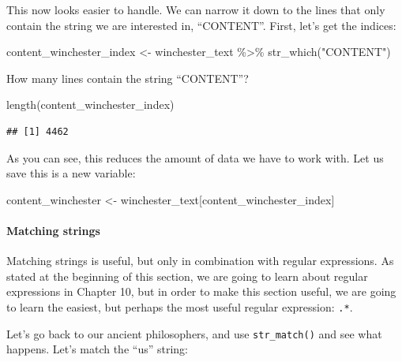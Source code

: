 \documentclass[
]{article}
\newenvironment{Shaded}{\begin{snugshade}}{\end{snugshade}}
\newcommand{\FunctionTok}[1]{\textcolor[rgb]{0.00,0.00,0.00}{#1}}
\newcommand{\NormalTok}[1]{#1}
\newcommand{\OtherTok}[1]{\textcolor[rgb]{0.56,0.35,0.01}{#1}}
\newcommand{\SpecialCharTok}[1]{\textcolor[rgb]{0.00,0.00,0.00}{#1}}
\newcommand{\StringTok}[1]{\textcolor[rgb]{0.31,0.60,0.02}{#1}}
\begin{document}
This now looks easier to handle. We can narrow it down to the lines that only contain the string
we are interested in, ``CONTENT''. First, let's get the indices:

\begin{Shaded}
\begin{Highlighting}[]
\NormalTok{content\_winchester\_index }\OtherTok{\textless{}{-}}\NormalTok{ winchester\_text }\SpecialCharTok{\%\textgreater{}\%}
  \FunctionTok{str\_which}\NormalTok{(}\StringTok{"CONTENT"}\NormalTok{)}
\end{Highlighting}
\end{Shaded}

How many lines contain the string ``CONTENT''?

\begin{Shaded}
\begin{Highlighting}[]
\FunctionTok{length}\NormalTok{(content\_winchester\_index)}
\end{Highlighting}
\end{Shaded}

\begin{verbatim}
## [1] 4462
\end{verbatim}

As you can see, this reduces the amount of data we have to work with. Let us save this is a new
variable:

\begin{Shaded}
\begin{Highlighting}[]
\NormalTok{content\_winchester }\OtherTok{\textless{}{-}}\NormalTok{ winchester\_text[content\_winchester\_index]}
\end{Highlighting}
\end{Shaded}

\hypertarget{matching-strings}{%
\paragraph{Matching strings}\label{matching-strings}}

Matching strings is useful, but only in combination with regular expressions. As stated at the
beginning of this section, we are going to learn about regular expressions in Chapter 10, but in
order to make this section useful, we are going to learn the easiest, but perhaps the most useful
regular expression: \texttt{.*}.

Let's go back to our ancient philosophers, and use \texttt{str\_match()} and see what happens. Let's match
the ``us'' string:
\end{document}
